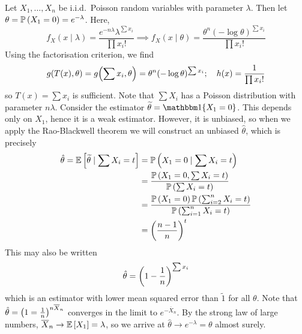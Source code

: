 \begin{example}
	Let \( X_1, \dots, X_n \) be i.i.d.\ Poisson random variables with parameter \( \lambda \).
	Then let \( \theta = \mathbb{P}\left({X_1 = 0}\right) = e^{-\lambda} \).
	Here,
	\[
		f_X(x \mid \lambda) = \frac{e^{-n \lambda} \lambda^{\sum x_i}}{\prod x_i!} \implies f_X(x \mid \theta) = \frac{\theta^n (-\log \theta)^{\sum x_i}}{\prod x_i!}
	\]
	Using the factorisation criterion, we find
	\[
		g(T(x), \theta) = g\qty(\sum x_i, \theta) = \theta^n (-\log\theta)^{\sum x_i};\quad h(x) = \frac{1}{\prod x_i!}
	\]
	so \( T(x) = \sum x_i \) is sufficient.
	Note that \( \sum X_i \) has a Poisson distribution with parameter \( n \lambda \).
	Consider the estimator \( \widetilde \theta = \mathbbm 1\qty{X_1 = 0} \).
	This depends only on \( X_1 \), hence it is a weak estimator.
	However, it is unbiased, so when we apply the Rao-Blackwell theorem we will construct an unbiased \( \hat \theta \), which is precisely
	\begin{align*}
		\hat \theta = \mathbb{E}\left[{\widetilde \theta \mid \sum X_i = t}\right] & = \mathbb{P}\left({X_1 = 0 \mid \sum X_i = t}\right)                                              \\
		                                                           & = \frac{\mathbb{P}\left({X_1 = 0, \sum X_i = t}\right)}{\mathbb{P}\left({\sum X_i = t}\right)}                      \\
		                                                           & = \frac{\mathbb{P}\left({X_1 = 0}\right)\mathbb{P}\left({\sum_{i=2}^n X_i = t}\right)}{\mathbb{P}\left({\sum_{i=1}^n X_i = t}\right)} \\
		                                                           & = \qty(\frac{n-1}{n})^t
	\end{align*}
	This may also be written
	\[
		\hat \theta = \qty(1 - \frac{1}{n})^{\sum x_i}
	\]
	which is an estimator with lower mean squared error than \( \widetilde 1 \) for all \( \theta \).
	Note that \( \hat \theta = \qty(1 = \frac{1}{n})^{n \overline X_n} \) converges in the limit to \( e^{-\overline X_n} \).
	By the strong law of large numbers, \( \overline X_n \to \mathbb{E}\left[{X_1}\right] = \lambda \), so we arrive at \( \hat \theta \to e^{-\lambda} = \theta \) almost surely.
\end{example}
